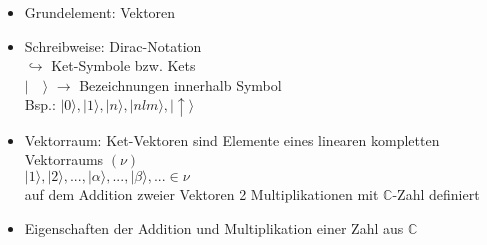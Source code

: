 \documentclass[10pt,article,colorback,accentcolor=tud9d]{scrartcl}
\begin{document}
\begin{itemize}
\item Grundelement: Vektoren
\item Schreibweise: Dirac-Notation\\
$\hookrightarrow$ Ket-Symbole bzw. Kets\\
$\left| \quad \rangle  \right.$ $\rightarrow$ Bezeichnungen innerhalb Symbol\\
Bsp.: $\left| 0\rangle \right.,\left|1\rangle \right.,\left|n\rangle \right.,\left|nlm\rangle \right.,
\left| \uparrow\rangle \right.$
\item Vektorraum: Ket-Vektoren sind Elemente eines linearen kompletten 
Vektorraums $(\nu)$\\
$\left|1\rangle \right.,\left|2\rangle \right.,...,\left|\alpha\rangle \right.,...,\left|\beta\rangle 
\right.,... \in \nu$\\
auf dem Addition zweier Vektoren 2 Multiplikationen mit $\mathbb{C}$-Zahl 
definiert
\item Eigenschaften der Addition und Multiplikation einer Zahl aus $\mathbb{C}$
 

\end{itemize}
\end{document}
